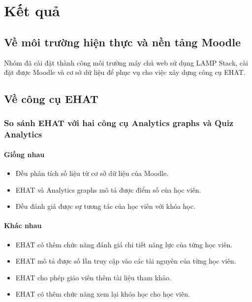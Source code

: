 \setcounter{chapter}{4}
\chapter{Kết quả}

\section{Về môi trường hiện thực và nền tảng Moodle}

Nhóm đã cài đặt thành công môi trường máy chủ web sử dụng LAMP Stack, cài đặt được Moodle và cơ sở dữ liệu để phục vụ cho việc xây dựng công cụ EHAT.

\section{Về công cụ EHAT}

\subsection{So sánh EHAT với hai công cụ Analytics graphs và Quiz Analytics}

\subsubsection{Giống nhau}

\begin{itemize}
	\item Đều phân tích số liệu từ cơ sở dữ liệu của Moodle.
	\item EHAT và Analytics graphs mô tả được điểm số của học viên.
	\item Đều đánh giá được sự tương tác của học viên với khóa học.
\end{itemize}

\subsubsection{Khác nhau}

\begin{itemize}
	\item EHAT có thêm chức năng đánh giá chi tiết năng lực của từng học viên.
	\item EHAT mô tả được số lần truy cập vào các tài nguyên của từng học viên.
	\item EHAT cho phép giáo viên thêm tài liệu tham khảo.
	\item EHAT có thêm chức năng xem lại khóa học cho học viên.
\end{itemize}

